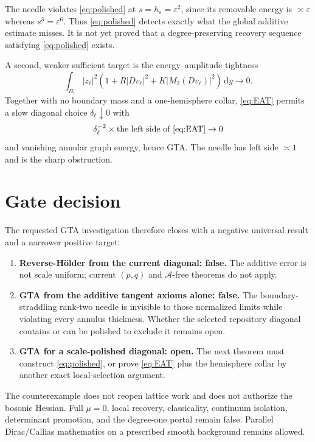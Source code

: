 \documentclass[10pt]{article}
\newcommand{\dd}{\,\mathrm d}
\begin{document}
The needle violates \eqref{eq:polished} at
$s=h_\varepsilon=\varepsilon^2$, since its removable energy is
$\asymp\varepsilon$ whereas $s^3=\varepsilon^6$.  Thus
\eqref{eq:polished} detects exactly what the global additive estimate misses.
It is not yet proved that a degree-preserving recovery sequence satisfying
\eqref{eq:polished} exists.

A second, weaker sufficient target is the energy--amplitude tightness
\begin{equation}
 \int_{B_1}|z_\ell|^2
 \left(1+R|Dv_\ell|^2+K|M_2(Dv_\ell)|^2\right)\dd y
 \longrightarrow0.                                    \label{eq:EAT}
\end{equation}
Together with no boundary mass and a one-hemisphere collar,
\eqref{eq:EAT} permits a slow diagonal choice
$\delta_\ell\downarrow0$ with
\[
 \delta_\ell^{-2}\times\text{the left side of \eqref{eq:EAT}}\to0
\]
and vanishing annular graph energy, hence GTA.  The needle has left side
$\asymp1$ and is the sharp obstruction.

\section{Gate decision}

The requested GTA investigation therefore closes with a negative universal
result and a narrower positive target:
\begin{enumerate}
 \item \textbf{Reverse-H\"older from the current diagonal: false.}
 The additive error is not scale uniform; current $(p,q)$ and
 $\mathscr A$-free theorems do not apply.
 \item \textbf{GTA from the additive tangent axioms alone: false.}
 The boundary-straddling rank-two needle is invisible to those normalized
 limits while violating every annulus thickness.  Whether the selected
 repository diagonal contains or can be polished to exclude it remains open.
 \item \textbf{GTA for a scale-polished diagonal: open.}
 The next theorem must construct \eqref{eq:polished}, or prove
 \eqref{eq:EAT} plus the hemisphere collar by another exact local-selection
 argument.
\end{enumerate}

The counterexample does not reopen lattice work and does not authorize the
bosonic Hessian.  Full $\mu=0$, local recovery, classicality, continuum
isolation, determinant promotion, and the degree-one portal remain false.
Parallel Dirac/Callias mathematics on a prescribed smooth background remains
allowed.
\end{document}
